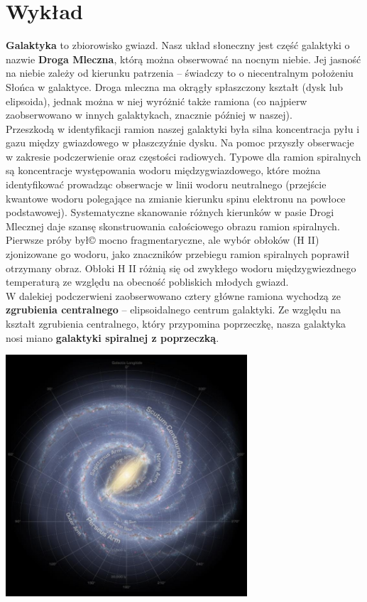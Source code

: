 \documentclass[../index.tex]{subfiles}
\begin{document}
    \section{Wykład}
        \textbf{Galaktyka} to zbiorowisko gwiazd. Nasz układ słoneczny jest część galaktyki o nazwie \textbf{Droga Mleczna}, którą można obserwować na nocnym niebie. Jej jasność na niebie zależy od kierunku patrzenia – świadczy to o niecentralnym położeniu Słońca w galaktyce. Droga mleczna ma okrągły spłaszczony kształt (dysk lub elipsoida), jednak można w niej wyróżnić także ramiona (co najpierw zaobserwowano w innych galaktykach, znacznie później w naszej).\\
        Przeszkodą w identyfikacji ramion naszej galaktyki była silna koncentracja pyłu i gazu między gwiazdowego w płaszczyźnie dysku. Na pomoc przyszły obserwacje w zakresie podczerwienie oraz częstości radiowych. Typowe dla ramion spiralnych są koncentracje występowania wodoru międzygwiazdowego, które można identyfikować prowadząc obserwacje w linii wodoru neutralnego (przejście kwantowe wodoru polegające na zmianie kierunku spinu elektronu na powłoce podstawowej). Systematyczne skanowanie różnych kierunków w pasie Drogi Mlecznej daje szansę skonstruowania całościowego obrazu ramion spiralnych. Pierwsze próby był© mocno fragmentaryczne, ale wybór obłoków (H II) zjonizowane go wodoru, jako znaczników przebiegu ramion spiralnych poprawił otrzymany obraz. Obłoki H II różnią się od zwykłego wodoru międzygwiezdnego temperaturą ze względu na obecność pobliskich młodych gwiazd.\\
        W dalekiej podczerwieni zaobserwowano cztery główne ramiona wychodzą ze \textbf{zgrubienia centralnego} – elipsoidalnego centrum galaktyki. Ze względu na kształt zgrubienia centralnego, który przypomina poprzeczkę, nasza galaktyka nosi miano \textbf{galaktyki spiralnej z poprzeczką}.
        \begin{center}
            \includegraphics[width=9cm]{images/drogaMleczna.png}
        \end{center}
\end{document}
